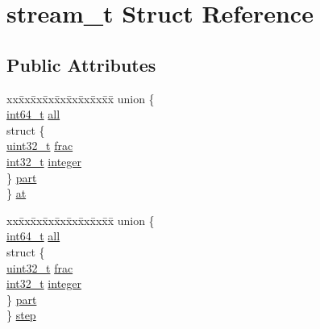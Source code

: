 \hypertarget{structstream__t}{}\section{stream\+\_\+t Struct Reference}
\label{structstream__t}
\subsection*{Public Attributes}
\begin{DoxyCompactItemize}
\item 
\begin{tabbing}
xx\=xx\=xx\=xx\=xx\=xx\=xx\=xx\=xx\=\kill
union \{\\
\>\hyperlink{lib-src_2ffmpeg_2win32_2stdint_8h_a67a9885ef4908cb72ce26d75b694386c}{int64\_t} \hyperlink{structstream__t_a307812623a233a3b4daee8286f003f43}{all}\\
\>struct \{\\
\>\>\hyperlink{lib-src_2ffmpeg_2win32_2stdint_8h_a6eb1e68cc391dd753bc8ce896dbb8315}{uint32\_t} \hyperlink{structstream__t_a85ea5c6882b4dc232f1b496ebe25925c}{frac}\\
\>\>\hyperlink{lib-src_2ffmpeg_2win32_2stdint_8h_a37994e3b11c72957c6f454c6ec96d43d}{int32\_t} \hyperlink{structstream__t_acc952a91b88789c20bb3aac4fac13a56}{integer}\\
\>\} \hyperlink{structstream__t_a077b0dc83ed4a7cbcaa23534871fe69b}{part}\\
\} \hyperlink{structstream__t_aed28aebc2f1b1852f1e50431a19f9199}{at}\\

\end{tabbing}\item 
\begin{tabbing}
xx\=xx\=xx\=xx\=xx\=xx\=xx\=xx\=xx\=\kill
union \{\\
\>\hyperlink{lib-src_2ffmpeg_2win32_2stdint_8h_a67a9885ef4908cb72ce26d75b694386c}{int64\_t} \hyperlink{structstream__t_a307812623a233a3b4daee8286f003f43}{all}\\
\>struct \{\\
\>\>\hyperlink{lib-src_2ffmpeg_2win32_2stdint_8h_a6eb1e68cc391dd753bc8ce896dbb8315}{uint32\_t} \hyperlink{structstream__t_a85ea5c6882b4dc232f1b496ebe25925c}{frac}\\
\>\>\hyperlink{lib-src_2ffmpeg_2win32_2stdint_8h_a37994e3b11c72957c6f454c6ec96d43d}{int32\_t} \hyperlink{structstream__t_acc952a91b88789c20bb3aac4fac13a56}{integer}\\
\>\} \hyperlink{structstream__t_a077b0dc83ed4a7cbcaa23534871fe69b}{part}\\
\} \hyperlink{structstream__t_ae4376a6893b782ee289fdb923d7e7f72}{step}\\


\end{tabbing}
\end{DoxyCompactItemize}

